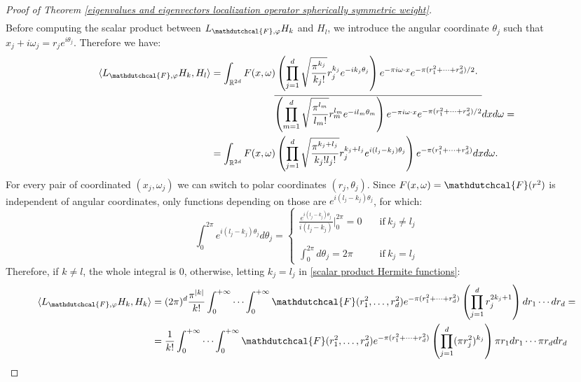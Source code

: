 \documentclass[corpo=11pt, stile=classica, tipotesi=custom,
greek, evenboxes, english]{toptesi}
\numberwithin{equation}{chapter}
\theoremstyle{remark}
\newcommand{\R}{\mathbb{R}} %
\begin{document}
\begin{proof}[Proof of Theorem \ref{eigenvalues and eigenvectors localization operator spherically symmetric weight}]
{\begin{align*}
	\end{align*}}
	Before computing the scalar product between $L_{\mathdutchcal{F},\varphi} H_k$ and $H_l$, we introduce the angular coordinate $\theta_j$ such that $x_j + i \omega_j = r_j e^{i\theta_j}$. Therefore we have:
	\begin{align}
		\langle  L_{\mathdutchcal{F},\varphi}H_k,H_l\rangle &= \int_{\R^{2d}} F(x,\omega) \left(\prod_{j=1}^d \sqrt{\dfrac{\pi^{k_j}}{k_j!}} r_j^{k_j}e^{-i k_j \theta_j}\right)e^{-\pi i \omega \cdot x} e^{-\pi(r_1^2 + \cdots + r_d^2)/2} \cdot \nonumber\\
															&\hphantom{=\int_{\R^{2d}} F(x,\omega)} \,\overline{\left(\prod_{m=1}^d \sqrt{\dfrac{\pi^{l_m}}{l_m!}} r_m^{l_m}e^{-i l_m \theta_m}\right)e^{-\pi i \omega \cdot x} e^{-\pi(r_1^2 + \cdots + r_d^2)/2}}dxd\omega= \nonumber\\
															&=\int_{\R^{2d}} F(x,\omega) \left(\prod_{j=1}^d \sqrt{\dfrac{\pi^{k_j + l_j}}{k_j!l_j!}} r_j^{k_j + l_j} e^{i(l_j - k_j)\theta_j} \right) e^{-\pi(r_1^2 + \cdots + r_d^2)}dxd\omega. \label{scalar product Hermite functions}
	\end{align}
	For every pair of coordinated $(x_j,\omega_j)$ we can switch to polar coordinates $(r_j,\theta_j)$. Since $F(x,\omega) = \mathdutchcal{F}(r^2)$ is independent of angular coordinates, only functions depending on those are $e^{i(l_j - k_j)\theta_j}$, for which:
	\begin{equation*}
		\int_0^{2\pi} e^{i(l_j - k_j)\theta_j}d\theta_j = \begin{cases}
			\displaystyle \frac{e^{i(l_j - k_j)\theta_j}}{i(l_j - k_j)} \bigg\rvert_0^{2\pi}=0 \quad & \mathrm{if\ } k_j \neq l_j\\
			\phantom{a}\\
			\displaystyle \int_0^{2\pi} d\theta_j = 2\pi \quad &\mathrm{if\ } k_j=l_j
		\end{cases}
	\end{equation*}
	Therefore, if $k \neq l$, the whole integral is 0, otherwise, letting $k_j = l_j$ in \eqref{scalar product Hermite functions}:
	\begin{align*}
		\langle  L_{\mathdutchcal{F},\varphi}H_k,H_k\rangle &= (2\pi)^d \dfrac{\pi^{|k|}}{k!}\int_0^{+\infty} {\cdots} \int_0^{+\infty} \mathdutchcal{F}(r_1^2,\ldots,r_d^2) e^{-\pi(r_1^2 + \cdots + r_d^2)}\left(\prod_{j=1}^{d} r_j^{2k_j + 1} \right) dr_1 \cdots dr_d=\\
															&= \dfrac{1}{k!} \int_0^{+\infty} \cdots \int_0^{+\infty} \mathdutchcal{F}(r_1^2,\ldots,r_d^2) e^{-\pi(r_1^2 + \cdots + r_d^2)} \left(\prod_{j=1}^{d} (\pi r_j^2)^{k_j} \right) \pi r_1 dr_1 \cdots \pi r_d dr_d

\end{align*}
\end{proof}
\end{document}
